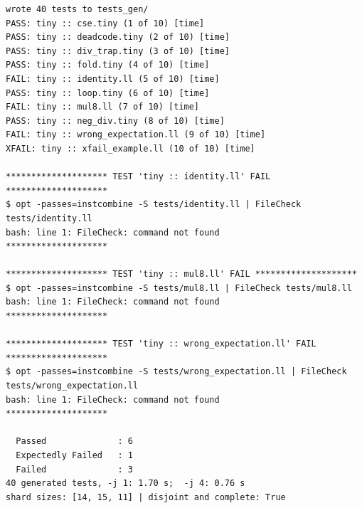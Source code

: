 \documentclass[10pt,a4paper,openany,oneside]{report}
\begin{document}
\begin{lstlisting}[style=out,basicstyle=\ttfamily\scriptsize]
wrote 40 tests to tests_gen/
PASS: tiny :: cse.tiny (1 of 10) [time]
PASS: tiny :: deadcode.tiny (2 of 10) [time]
PASS: tiny :: div_trap.tiny (3 of 10) [time]
PASS: tiny :: fold.tiny (4 of 10) [time]
FAIL: tiny :: identity.ll (5 of 10) [time]
PASS: tiny :: loop.tiny (6 of 10) [time]
FAIL: tiny :: mul8.ll (7 of 10) [time]
PASS: tiny :: neg_div.tiny (8 of 10) [time]
FAIL: tiny :: wrong_expectation.ll (9 of 10) [time]
XFAIL: tiny :: xfail_example.ll (10 of 10) [time]

******************** TEST 'tiny :: identity.ll' FAIL ********************
$ opt -passes=instcombine -S tests/identity.ll | FileCheck tests/identity.ll
bash: line 1: FileCheck: command not found
********************

******************** TEST 'tiny :: mul8.ll' FAIL ********************
$ opt -passes=instcombine -S tests/mul8.ll | FileCheck tests/mul8.ll
bash: line 1: FileCheck: command not found
********************

******************** TEST 'tiny :: wrong_expectation.ll' FAIL ********************
$ opt -passes=instcombine -S tests/wrong_expectation.ll | FileCheck tests/wrong_expectation.ll
bash: line 1: FileCheck: command not found
********************

  Passed              : 6
  Expectedly Failed   : 1
  Failed              : 3
40 generated tests, -j 1: 1.70 s;  -j 4: 0.76 s
shard sizes: [14, 15, 11] | disjoint and complete: True
\end{lstlisting}
\end{document}
